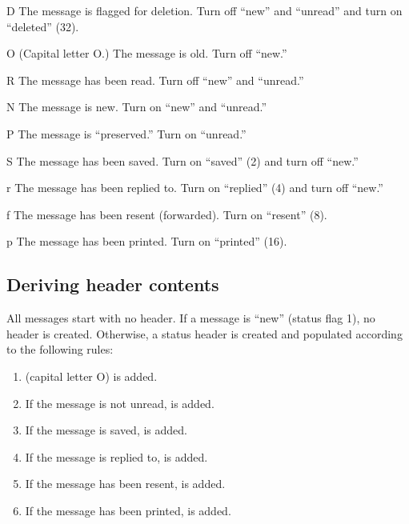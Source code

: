 \begin{list}{}{ %
  \setlength{\itemsep}{0pt}
  \settowidth{\labelwidth}{D}
  \renewcommand{\makelabel}[1]{{\rm {\tt #1}}}}
\item[D] The message is flagged for deletion.  Turn off ``new'' and
``unread'' and turn on ``deleted'' (32).
\item[O] (Capital letter O.)  The message is old.  Turn off ``new.''
\item[R] The message has been read.  Turn off ``new'' and ``unread.''
\item[N] The message is new.  Turn on ``new'' and ``unread.''
\item[P] The message is ``preserved.''  Turn on ``unread.''
\item[S] The message has been saved.  Turn on ``saved'' (2) and turn
off ``new.''
\item[r] The message has been replied to.  Turn on ``replied'' (4) and
turn off ``new.''
\item[f] The message has been resent (forwarded).  Turn on ``resent''
(8).
\item[p] The message has been printed.  Turn on ``printed'' (16).
\end{list}

\subsection{Deriving  header contents}

All messages start with no  header.  If a message is
``new'' (status flag 1), no  header is created.
Otherwise, a status header is created and populated according to the
following rules:

\begin{enumerate}
\item {} (capital letter O) is added.
\item If the message is not unread,  is added.
\item If the message is saved,  is added.
\item If the message is replied to,  is added.
\item If the message has been resent,  is added.
\item If the message has been printed,  is added.
\end{enumerate}


